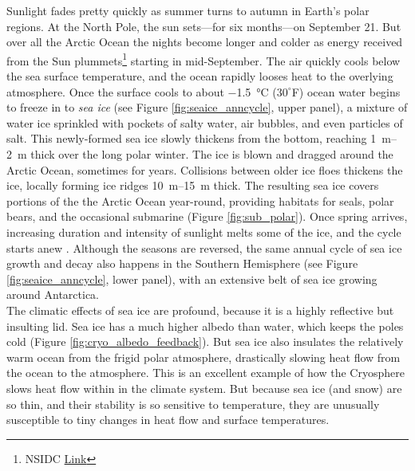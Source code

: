 \documentclass[amstex,12pt]{book}
\begin{document}
Sunlight fades pretty quickly as summer turns to autumn in Earth's polar regions. At the North Pole, the sun sets---for six months---on September 21. But over all the Arctic Ocean the nights become longer and colder as energy received from the Sun plummets\footnote{NSIDC \href{http://nsidc.org/arcticseaicenews/2017/09/arctic-sea-ice-at-minimum-extent-2/}{Link}} starting in mid-September. The air quickly cools below the sea surface temperature, and the ocean rapidly looses heat to the overlying atmosphere. Once the surface cools to about \SI{-1.5}{\celsius} ($30^{\circ}$F) ocean water begins to freeze in to \emph{sea ice} (see Figure \ref{fig:seaice_anncycle}, upper panel), a mixture of water ice sprinkled with pockets of salty water, air bubbles, and even particles of salt. This newly-formed sea ice slowly thickens from the bottom, reaching \SIrange{1}{2}{\metre} thick over the long polar winter. The ice is blown and dragged around the Arctic Ocean, sometimes for years. Collisions between older ice floes thickens the ice, locally forming ice ridges \SIrange{10}{15}{\metre} thick. The resulting sea ice covers portions of the the Arctic Ocean year-round, providing habitats for seals, polar bears, and the occasional submarine (Figure \ref{fig:sub_polar}). Once spring arrives, increasing duration and intensity of sunlight melts some of the ice, and the cycle starts anew . Although the seasons are reversed, the same annual cycle of sea ice growth and decay also happens in the Southern Hemisphere (see Figure \ref{fig:seaice_anncycle}, lower panel), with an extensive belt of sea ice growing around Antarctica.\\ 
     
The climatic effects of sea ice are profound, because it is a highly reflective but insulting lid. Sea ice has a much higher albedo than water, which keeps the poles cold (Figure \ref{fig:cryo_albedo_feedback}). But sea ice also insulates the relatively warm ocean from the frigid polar atmosphere, drastically slowing heat flow from the ocean to the atmosphere. This is an excellent example of how the Cryosphere slows heat flow within in the climate system. But because sea ice (and snow) are so thin, and their stability is so sensitive to temperature, they are unusually susceptible to tiny changes in heat flow and surface temperatures.\\
\end{document}
